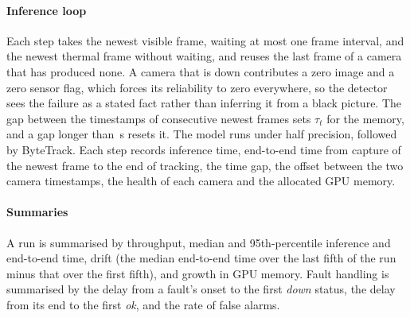\paragraph{Inference loop}
Each step takes the newest visible frame, waiting at most one frame interval, and the newest thermal frame without waiting, and reuses the last frame of a camera that has produced none. A camera that is down contributes a zero image and a zero sensor flag, which forces its reliability to zero everywhere, so the detector sees the failure as a stated fact rather than inferring it from a black picture. The gap between the timestamps of consecutive newest frames sets $\tau_t$ for the memory, and a gap longer than \cfgResetS{}\,s resets it. The model runs under half precision, followed by ByteTrack. Each step records inference time, end-to-end time from capture of the newest frame to the end of tracking, the time gap, the offset between the two camera timestamps, the health of each camera and the allocated GPU memory.

\paragraph{Summaries}
A run is summarised by throughput, median and 95th-percentile inference and end-to-end time, drift (the median end-to-end time over the last fifth of the run minus that over the first fifth), and growth in GPU memory. Fault handling is summarised by the delay from a fault's onset to the first \emph{down} status, the delay from its end to the first \emph{ok}, and the rate of false alarms.
